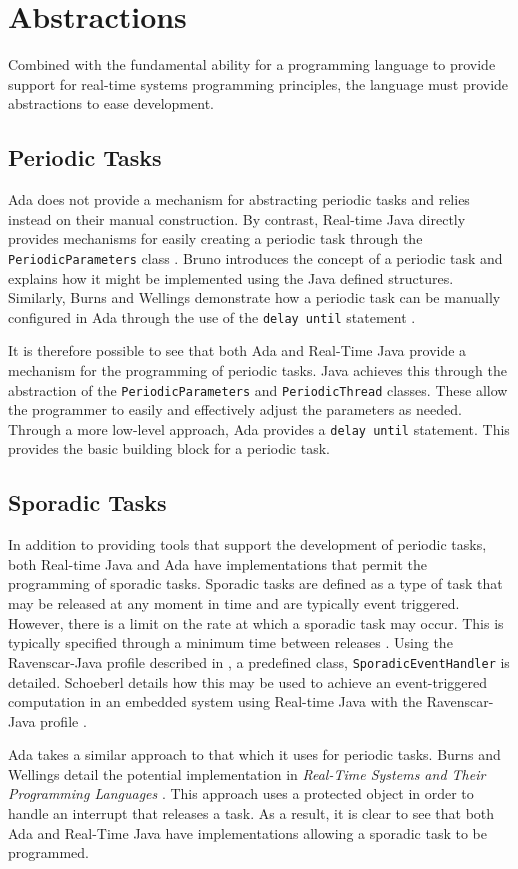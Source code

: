 \section{Abstractions}

Combined with the fundamental ability for a programming language to provide
support for real-time systems programming principles, the language must provide
abstractions to ease development.

\subsection{Periodic Tasks} 
Ada does not provide a mechanism for
abstracting periodic tasks and relies instead on their manual construction. 
By contrast, Real-time Java directly provides mechanisms for easily creating a periodic task
through the \texttt{PeriodicParameters} class \cite{real-time-systems}. 
Bruno  introduces the concept of a periodic task
and explains how it might be implemented using the Java defined
structures\cite{periodic-java-thread}.
Similarly, Burns and Wellings 
demonstrate how a periodic task can be manually configured in
Ada through the use of the \texttt{delay until} statement \cite{burns1998concurrency}.
\par\bigskip\noindent
It is therefore possible to see that both Ada and
Real-Time Java provide a mechanism for the programming of periodic tasks. Java
achieves this through the abstraction of the \texttt{PeriodicParameters} and
\texttt{PeriodicThread} classes.  These allow the programmer to easily and
effectively adjust the parameters as needed.  Through a more low-level
approach, Ada provides a \texttt{delay until}
statement. This provides the basic building block for a periodic task.

\subsection{Sporadic Tasks}
In addition to providing tools that support the development of periodic tasks,
both Real-time Java and Ada have implementations that permit the programming of
sporadic tasks.  Sporadic tasks are defined as a type of task that may be
released at any moment in time and are typically event triggered. However,
there is a limit on the rate at which a sporadic task may occur. This is
typically specified through a minimum time between releases \cite{11111101}.
Using the Ravenscar-Java profile described in \cite{ravenscar-java}, a
predefined class, \texttt{SporadicEventHandler} is detailed. Schoeberl details
how this may be used to achieve an event-triggered computation in an embedded
system using Real-time Java with the Ravenscar-Java profile \cite{1300334}.
\par\bigskip\noindent
Ada takes a similar approach to that which it uses for periodic tasks. Burns
and Wellings detail the potential implementation in \emph{Real-Time Systems and
Their Programming Languages} \cite[p341]{real-time-systems}.  This approach
uses a protected object in order to handle an interrupt that releases a task.
As a result, it is clear to see that both Ada and Real-Time Java have
implementations allowing a sporadic task to be programmed. 

